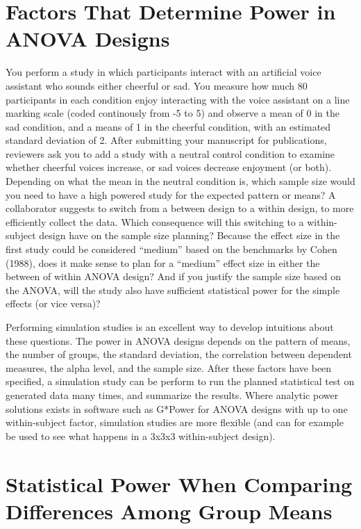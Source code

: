 \documentclass[,jou, draftfirst, a4paper,floatsintext]{apa6}
\begin{document}
\hypertarget{factors-that-determine-power-in-anova-designs}{%
\section{Factors That Determine Power in ANOVA Designs}\label{factors-that-determine-power-in-anova-designs}}

You perform a study in which participants interact with an artificial voice assistant who sounds either cheerful or sad.
You measure how much 80 participants in each condition enjoy interacting with the voice assistant on a line marking scale (coded continously from -5 to 5) and observe a mean of 0 in the sad condition, and a means of 1 in the cheerful condition, with an estimated standard deviation of 2.
After submitting your manuscript for publications, reviewers ask you to add a study with a neutral control condition to examine whether cheerful voices increase, or sad voices decrease enjoyment (or both).
Depending on what the mean in the neutral condition is, which sample size would you need to have a high powered study for the expected pattern or means?
A collaborator suggests to switch from a between design to a within design, to more efficiently collect the data.
Which consequence will this switching to a within-subject design have on the sample size planning?
Because the effect size in the first study could be considered \enquote{medium} based on the benchmarks by Cohen (1988), does it make sense to plan for a \enquote{medium} effect size in either the between of within ANOVA design?
And if you justify the sample size based on the ANOVA, will the study also have sufficient statistical power for the simple effects (or vice versa)?

Performing simulation studies is an excellent way to develop intuitions about these questions.
The power in ANOVA designs depends on the pattern of means, the number of groups, the standard deviation, the correlation between dependent measures, the alpha level, and the sample size.
After these factors have been specified, a simulation study can be perform to run the planned statistical test on generated data many times, and summarize the results.
Where analytic power solutions exists in software such as G*Power for ANOVA designs with up to one within-subject factor, simulation studies are more flexible (and can for example be used to see what happens in a 3x3x3 within-subject design).

\hypertarget{statistical-power-when-comparing-differences-among-group-means}{%
\section{Statistical Power When Comparing Differences Among Group Means}\label{statistical-power-when-comparing-differences-among-group-means}}
\end{document}

